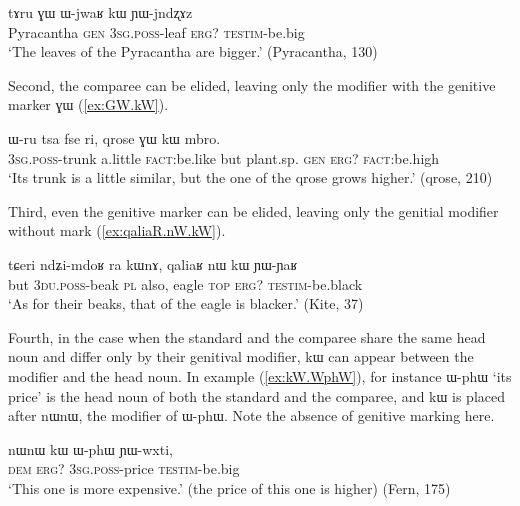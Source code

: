 \documentclass[oldfontcommands,oneside,a4paper,11pt]{article}
\newcommand{\ipa}[1]{{\phon #1}} %
\begin{document}
\begin{exe}
\ex \label{ex:GW.WjwaR.kW}
\gll 
\ipa{tɤru}  	\ipa{ɣɯ}  	\ipa{ɯ-jwaʁ}  	\ipa{kɯ}  	\ipa{ɲɯ-jndʐɤz}  \\
Pyracantha \textsc{gen} \textsc{3sg.poss}-leaf \textsc{erg?} \textsc{testim}-be.big \\
\glt `The leaves of the Pyracantha are bigger.' (Pyracantha, 130)
 \end{exe}
Second,  the comparee can be elided, leaving only the modifier with the genitive marker \ipa{ɣɯ} (\ref{ex:GW.kW}).  
\begin{exe}
\ex \label{ex:GW.kW}
\gll 
\ipa{ɯ-ru}  	\ipa{tsa}  	\ipa{fse}  	\ipa{ri,}  	\ipa{qrose}  	\ipa{ɣɯ}  	\ipa{kɯ}  	\ipa{mbro.}  \\
\textsc{3sg.poss}-trunk a.little \textsc{fact}:be.like but plant.sp. \textsc{gen} \textsc{erg?} \textsc{fact}:be.high \\
\glt `Its  trunk is a little similar, but the one of the \ipa{qrose} grows higher.' (qrose, 210)
\end{exe}

Third, even the genitive marker can be elided, leaving only the genitial modifier without mark (\ref{ex:qaliaR.nW.kW}).
\begin{exe}
\ex \label{ex:qaliaR.nW.kW}
\gll 
\ipa{tɕeri}  	\ipa{ndʑi-mdoʁ}  	\ipa{ra}  	\ipa{kɯnɤ,}  	\ipa{qaliaʁ}  	\ipa{nɯ}  	\ipa{kɯ}  	\ipa{ɲɯ-ɲaʁ}  \\
but \textsc{3du.poss}-beak \textsc{pl} also, eagle \textsc{top} \textsc{erg?} \textsc{testim}-be.black \\
\glt `As for their beaks, that of the eagle is blacker.' (Kite, 37)
\end{exe}
Fourth, in the case when   the standard and the comparee share the same head noun and differ only by their genitival modifier, \ipa{kɯ} can appear between the modifier and the head noun. In example (\ref{ex:kW.WphW}), for instance \ipa{ɯ-phɯ} `its price' is the head noun of both the standard and the comparee, and \ipa{kɯ} is placed after \ipa{nɯnɯ}, the  modifier of   \ipa{ɯ-phɯ}. Note the absence of genitive marking here.

 \begin{exe}
\ex \label{ex:kW.WphW}
\gll 
\ipa{nɯnɯ}  	\ipa{kɯ}  	\ipa{ɯ-phɯ}  	\ipa{ɲɯ-wxti,}  \\
\textsc{dem} \textsc{erg?} \textsc{3sg.poss}-price \textsc{testim}-be.big \\
\glt `This one is more expensive.' (the price of this one is higher) (Fern, 175)
\end{exe}
\end{document}
